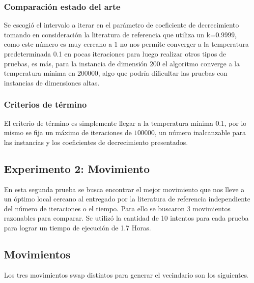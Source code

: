 

\subsubsection{Comparación estado del arte}

Se escogió el intervalo a iterar en el parámetro de coeficiente de decrecimiento tomando en consideración la literatura de referencia \cite{sonuc-2017} que utiliza un k=$0.9999$, como este número es muy cercano a 1 no nos permite converger a la temperatura predeterminada 0.1 en pocas iteraciones para luego realizar otros tipos de pruebas, es más, para la instancia de dimensión $200$ el algoritmo converge a la temperatura mínima en  $200000$, algo que podría dificultar las pruebas con instancias de dimensiones altas. 

\subsubsection{Criterios de término}
El criterio de término es simplemente llegar a la temperatura mínima $0.1$, por lo mismo se fija un máximo de iteraciones de $100000$, un número inalcanzable para las instancias y los coeficientes de decrecimiento presentados.

\subsection{Experimento 2: Movimiento}
En esta segunda prueba se busca encontrar el mejor movimiento que nos lleve a un óptimo local cercano al entregado por la literatura de referencia \cite{sonuc-2017} independiente del número de iteraciones o el tiempo. Para ello se buscaron 3 movimientos razonables para comparar.
Se utilizó la cantidad de 10 intentos para cada prueba para lograr un tiempo de ejecución de 1.7 Horas.

\subsection{Movimientos}
Los tres movimientos swap distintos para generar el vecindario son los siguientes.

